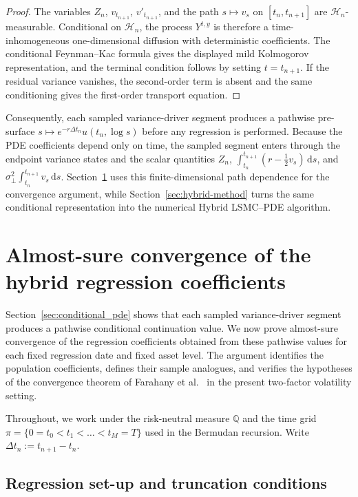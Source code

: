 \documentclass[10pt]{article}
\theoremstyle{plain}
\theoremstyle{definition}
\theoremstyle{remark}
\newcommand{\dd}{\mathrm d}
\begin{document}
\begin{proof}
The variables $Z_n$, $v_{t_{n+1}}$, $v'_{t_{n+1}}$, and the path $s\mapsto v_s$ on $[t_n,t_{n+1}]$ are
$\mathcal H_n$-measurable. Conditional on $\mathcal H_n$, the process $Y^{t,y}$ is therefore a
time-inhomogeneous one-dimensional diffusion with deterministic coefficients. The conditional Feynman--Kac
formula \cite[Ch.~5]{karatzas1991brownian} gives the displayed mild Kolmogorov representation, and the terminal
condition follows by setting $t=t_{n+1}$. If the residual variance vanishes, the second-order term is absent and
the same conditioning gives the first-order transport equation.
\end{proof}

Consequently, each sampled variance-driver segment produces a pathwise pre-surface
$s\mapsto e^{-r\Delta t_n}u(t_n,\log s)$ before any regression is performed. Because the PDE coefficients
depend only on time, the sampled segment enters through the endpoint variance states and the scalar quantities
$Z_n$, $\int_{t_n}^{t_{n+1}}(r-\frac12v_s)\,\dd s$, and
$\sigma_\perp^2\int_{t_n}^{t_{n+1}}v_s\,\dd s$. Section~\ref{sec:as_convergence} uses this finite-dimensional
path dependence for the convergence argument, while Section~\ref{sec:hybrid-method} turns the same conditional
representation into the numerical Hybrid LSMC--PDE algorithm.


\section{Almost-sure convergence of the hybrid regression coefficients}
\label{sec:as_convergence}

Section~\ref{sec:conditional_pde} shows that each sampled variance-driver segment produces a pathwise
conditional continuation value. We now prove almost-sure convergence of the regression coefficients obtained
from these pathwise values for each fixed regression date and fixed asset level. The argument identifies the
population coefficients, defines their sample analogues, and verifies the hypotheses of the convergence theorem
of Farahany et al.~\cite{farahany2020mixing} in the present two-factor volatility setting.

Throughout, we work under the risk-neutral measure $\mathbb{Q}$ and the time grid
$\pi=\{0=t_0<t_1<\dots<t_M=T\}$ used in the Bermudan recursion. Write
$\Delta t_n:=t_{n+1}-t_n$.

\subsection{Regression set-up and truncation conditions}
\label{subsec:regression_truncation}
\end{document}
